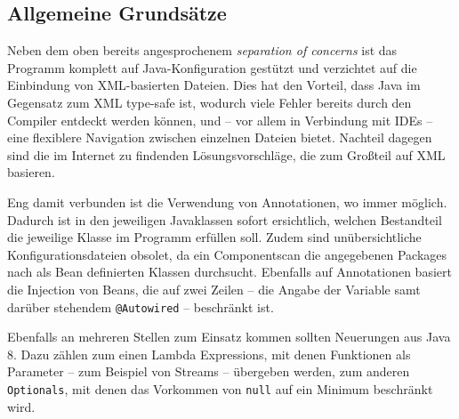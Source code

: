 \subsection{Allgemeine Grundsätze}

Neben dem oben bereits angesprochenem \textit{separation of concerns} ist das Programm komplett auf Java-Konfiguration gestützt und verzichtet auf die Einbindung von XML-basierten Dateien. Dies hat den Vorteil, dass Java im Gegensatz zum XML type-safe ist, wodurch viele Fehler bereits durch den Compiler entdeckt werden können, und -- vor allem in Verbindung mit IDEs -- eine flexiblere Navigation zwischen einzelnen Dateien bietet. Nachteil dagegen sind die im Internet zu findenden Lösungsvorschläge, die zum Großteil auf XML basieren.

Eng damit verbunden ist die Verwendung von Annotationen, wo immer möglich. Dadurch ist in den jeweiligen Javaklassen sofort ersichtlich, welchen Bestandteil die jeweilige Klasse im Programm erfüllen soll. Zudem sind unübersichtliche Konfigurationsdateien obsolet, da ein Componentscan die angegebenen Packages nach als Bean definierten Klassen durchsucht. Ebenfalls auf Annotationen basiert die Injection von Beans, die auf zwei Zeilen -- die Angabe der Variable samt darüber stehendem \texttt{@Autowired} -- beschränkt ist.

Ebenfalls an mehreren Stellen zum Einsatz kommen sollten Neuerungen aus Java 8. Dazu zählen zum einen Lambda Expressions, mit denen Funktionen als Parameter -- zum Beispiel von Streams -- übergeben werden, zum anderen \texttt{Optionals}, mit denen das Vorkommen von \texttt{null} auf ein Minimum beschränkt wird.